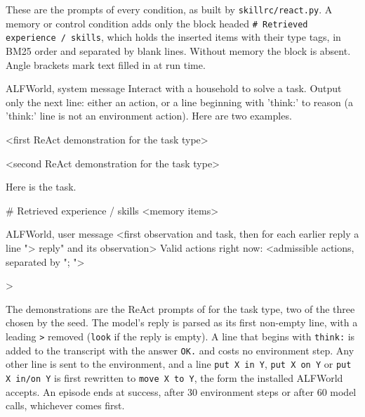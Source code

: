 These are the prompts of every condition, as built by \texttt{skillrc/react.py}. A memory or control
condition adds only the block headed \texttt{\# Retrieved experience / skills}, which holds the inserted
items with their type tags, in BM25 order and separated by blank lines. Without memory the block is
absent. Angle brackets mark text filled in at run time.

\begin{promptbox}{ALFWorld, system message}
Interact with a household to solve a task. Output only the next line: either an action, or a line beginning with 'think:' to reason (a 'think:' line is not an environment action). Here are two examples.

<first ReAct demonstration for the task type>

<second ReAct demonstration for the task type>

Here is the task.

# Retrieved experience / skills
<memory items>
\end{promptbox}

\begin{promptbox}{ALFWorld, user message}
<first observation and task, then for each earlier reply a line "> reply" and its observation>
Valid actions right now: <admissible actions, separated by "; ">

>
\end{promptbox}

\noindent The demonstrations are the ReAct prompts of \citet{yao2023react} for the task type, two of the
three chosen by the seed. The model's reply is parsed as its first non-empty line, with a leading
\texttt{>} removed (\texttt{look} if the reply is empty). A line that begins with \texttt{think:} is added
to the transcript with the answer \texttt{OK.} and costs no environment step. Any other line is sent to
the environment, and a line \texttt{put X in Y}, \texttt{put X on Y} or \texttt{put X in/on Y} is first
rewritten to \texttt{move X to Y}, the form the installed ALFWorld accepts. An episode ends at success,
after 30 environment steps or after 60 model calls, whichever comes first.

